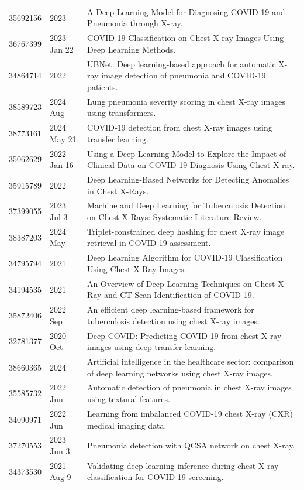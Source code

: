 \begin{longtable}{llp{9.5cm}}
35692156 & 2023 & A Deep Learning Model for Diagnosing COVID-19 and Pneumonia through X-ray. \\
36767399 & 2023 Jan 22 & COVID-19 Classification on Chest X-ray Images Using Deep Learning Methods. \\
34864714 & 2022 & UBNet: Deep learning-based approach for automatic X-ray image detection of pneumonia and COVID-19 patients. \\
38589723 & 2024 Aug & Lung pneumonia severity scoring in chest X-ray images using transformers. \\
38773161 & 2024 May 21 & COVID‑19 detection from chest X-ray images using transfer learning. \\
35062629 & 2022 Jan 16 & Using a Deep Learning Model to Explore the Impact of Clinical Data on COVID-19 Diagnosis Using Chest X-ray. \\
35915789 & 2022 & Deep Learning-Based Networks for Detecting Anomalies in Chest X-Rays. \\
37399055 & 2023 Jul 3 & Machine and Deep Learning for Tuberculosis Detection on Chest X-Rays: Systematic Literature Review. \\
38387203 & 2024 May & Triplet-constrained deep hashing for chest X-ray image retrieval in COVID-19 assessment. \\
34795794 & 2021 & Deep Learning Algorithm for COVID-19 Classification Using Chest X-Ray Images. \\
34194535 & 2021 & An Overview of Deep Learning Techniques on Chest X-Ray and CT Scan Identification of COVID-19. \\
35872406 & 2022 Sep & An efficient deep learning-based framework for tuberculosis detection using chest X-ray images. \\
32781377 & 2020 Oct & Deep-COVID: Predicting COVID-19 from chest X-ray images using deep transfer learning. \\
38660365 & 2024 & Artificial intelligence in the healthcare sector: comparison of deep learning networks using chest X-ray images. \\
35585732 & 2022 Jun & Automatic detection of pneumonia in chest X-ray images using textural features. \\
34090971 & 2022 Jun & Learning from imbalanced COVID-19 chest X-ray (CXR) medical imaging data. \\
37270553 & 2023 Jun 3 & Pneumonia detection with QCSA network on chest X-ray. \\
34373530 & 2021 Aug 9 & Validating deep learning inference during chest X-ray classification for COVID-19 screening. \\

\end{longtable}
